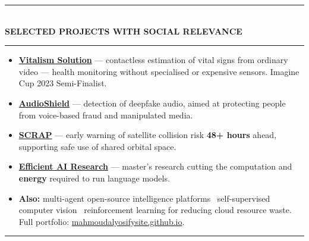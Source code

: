 \documentclass[10pt, a4paper]{article}
\newcommand{\cvsection}[1]{%
  \vspace{3pt}%
  {\color{navy}\rule{\linewidth}{1.1pt}}\\[0.5pt]%
  {\color{navy}\bfseries\fontsize{9.5}{11}\selectfont\uppercase{#1}}\\[-4pt]%
  {\color{teal}\rule{\linewidth}{0.6pt}}%
  \vspace{2pt}%
}
\newcommand{\cvmini}[2]{\item {\bfseries\color{navy}#1} --- #2}
\newenvironment{cvitems}{%
  \begin{itemize}[leftmargin=11pt, itemsep=0.5pt, parsep=0pt, topsep=1pt,
                  label={\textcolor{teal}{$\bullet$}}]
}{%
  \end{itemize}%
}
\begin{document}
\cvsection{Selected Projects with Social Relevance}

\begin{cvitems}
  \cvmini{\href{https://vitalismsolution.github.io/}{Vitalism Solution}}{contactless estimation of vital signs from ordinary video --- health monitoring without specialised or expensive sensors. Imagine Cup 2023 Semi-Finalist.}
  \cvmini{\href{https://github.com/MahmoudAlyosify/AudioShield}{AudioShield}}{detection of deepfake audio, aimed at protecting people from voice-based fraud and manipulated media.}
  \cvmini{\href{https://github.com/MahmoudAlyosify/SCRAP-Satellite-Collision-Risk-Assessment-and-Prediction}{SCRAP}}{early warning of satellite collision risk \textbf{48+ hours} ahead, supporting safe use of shared orbital space.}
  \cvmini{\href{https://github.com/MahmoudAlyosify/minimal-lm}{Efficient AI Research}}{master's research cutting the computation and \textbf{energy} required to run language models.}
  \item \textbf{Also:} multi-agent open-source intelligence platforms \textperiodcentered\ self-supervised computer vision \textperiodcentered\ reinforcement learning for reducing cloud resource waste. Full portfolio: \href{https://mahmoudalyosifysite.github.io/}{mahmoudalyosifysite.github.io}.
\end{cvitems}

\vspace{3pt}
{\color{navy}\rule{\linewidth}{0.8pt}}
\end{document}
